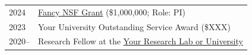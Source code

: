 
\begin{longtable}[l]{@{}p{} p{}@{}}
    2024 & \href{https://www.nsf.gov/}{Fancy NSF Grant} (\$1,000,000; Role: PI) \\
   
    2023 & Your University Outstanding Service Award (\$XXX) \\
       
    2020-- & Research Fellow at the \href{https://example.com/}{Your Research Lab or University} \\

   
\end{longtable}
